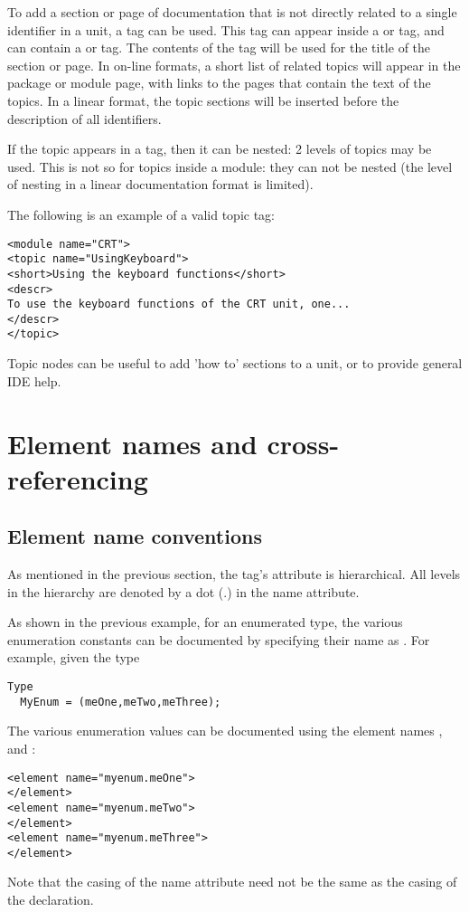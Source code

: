 To add a section or page of documentation that is not directly related to a
single identifier in a unit, a  tag can be used. This tag can
appear inside a  or  tag, and can contain a
 or  tag. The contents of the  tag will be
used for the title of the section or page. In on-line formats, a short list
of related topics will appear in the package or module page, with links to
the pages that contain the text of the topics. In a linear format, the topic
sections will be inserted before the description of all identifiers.

If the topic appears in a  tag, then it can be nested: 2 levels
of topics may be used. This is not so for topics inside a module: they can
not be nested (the level of nesting in a linear documentation format is limited).

The following is an example of a valid topic tag:
\begin{verbatim}
<module name="CRT">
<topic name="UsingKeyboard">
<short>Using the keyboard functions</short>
<descr>
To use the keyboard functions of the CRT unit, one...
</descr>
</topic>
\end{verbatim}

Topic nodes can be useful to add 'how to' sections to a unit, or to provide
general IDE help.

\section{Element names and cross-referencing}

\subsection{Element name conventions}
As mentioned in the previous section, the  tag's 
attribute is hierarchical. All levels in the hierarchy are denoted by a dot
(.) in the name attribute. 

As shown in the previous example, for an enumerated type, the various
enumeration constants can be documented by specifying their name as
. For example, given the type
\begin{verbatim}
Type
  MyEnum = (meOne,meTwo,meThree);
\end{verbatim}
The various enumeration values can be documented using the element names
,  and :
\begin{verbatim}
<element name="myenum.meOne">
</element>
<element name="myenum.meTwo">
</element>
<element name="myenum.meThree">
</element>
\end{verbatim}
Note that the casing of the name attribute need not be the same as the
casing of the declaration.

